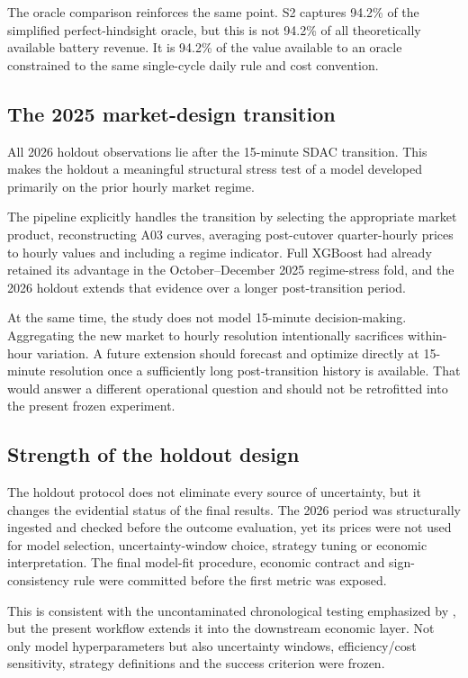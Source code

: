 The oracle comparison reinforces the same point. S2 captures 94.2\% of the simplified perfect-hindsight oracle, but this is not 94.2\% of all theoretically available battery revenue. It is 94.2\% of the value available to an oracle constrained to the same single-cycle daily rule and cost convention.

\subsection{The 2025 market-design transition}

All 2026 holdout observations lie after the 15-minute SDAC transition. This makes the holdout a meaningful structural stress test of a model developed primarily on the prior hourly market regime.

The pipeline explicitly handles the transition by selecting the appropriate market product, reconstructing A03 curves, averaging post-cutover quarter-hourly prices to hourly values and including a regime indicator. Full XGBoost had already retained its advantage in the October--December 2025 regime-stress fold, and the 2026 holdout extends that evidence over a longer post-transition period.

At the same time, the study does not model 15-minute decision-making. Aggregating the new market to hourly resolution intentionally sacrifices within-hour variation. A future extension should forecast and optimize directly at 15-minute resolution once a sufficiently long post-transition history is available. That would answer a different operational question and should not be retrofitted into the present frozen experiment.

\subsection{Strength of the holdout design}

The holdout protocol does not eliminate every source of uncertainty, but it changes the evidential status of the final results. The 2026 period was structurally ingested and checked before the outcome evaluation, yet its prices were not used for model selection, uncertainty-window choice, strategy tuning or economic interpretation. The final model-fit procedure, economic contract and sign-consistency rule were committed before the first metric was exposed.

This is consistent with the uncontaminated chronological testing emphasized by \citet{lago2021}, but the present workflow extends it into the downstream economic layer. Not only model hyperparameters but also uncertainty windows, efficiency/cost sensitivity, strategy definitions and the success criterion were frozen.

